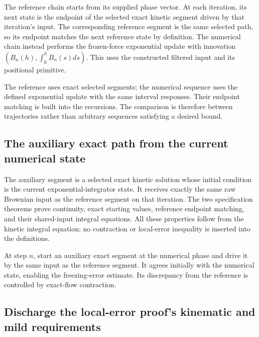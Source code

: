 \documentclass[11pt,a4paper]{report}
\begin{document}
The reference chain starts from its supplied phase vector. At each iteration, its next state is the endpoint of the selected exact kinetic segment driven by that iteration's input. The corresponding reference segment is the same selected path, so its endpoint matches the next reference state by definition. The numerical chain instead performs the frozen-force exponential update with innovation \((B_n(h),\int_0^hB_n(s)ds)\). This uses the constructed filtered input and its positional primitive.



The reference uses exact selected segments; the numerical sequence uses the defined exponential update with the same interval responses. Their endpoint matching is built into the recursions. The comparison is therefore between trajectories rather than arbitrary sequences satisfying a desired bound.

\subsection{\texorpdfstring{The auxiliary exact path from the current numerical state}{The auxiliary exact path from the current numerical state}}
\label{report-step-KineticLangevin-CoupledSegments-lean-5}


The auxiliary segment is a selected exact kinetic solution whose initial condition is the current exponential-integrator state. It receives exactly the same raw Brownian input as the reference segment on that iteration. The two specification theorems prove continuity, exact starting values, reference endpoint matching, and their shared-input integral equations. All these properties follow from the kinetic integral equation; no contraction or local-error inequality is inserted into the definitions.



At step \(n\), start an auxiliary exact segment at the numerical phase and drive it by the same input as the reference segment. It agrees initially with the numerical state, enabling the freezing-error estimate. Its discrepancy from the reference is controlled by exact-flow contraction.

\subsection{\texorpdfstring{Discharge the local-error proof's kinematic and mild requirements}{Discharge the local-error proof's kinematic and mild requirements}}
\label{report-step-KineticLangevin-CoupledSegments-lean-6}
\end{document}
